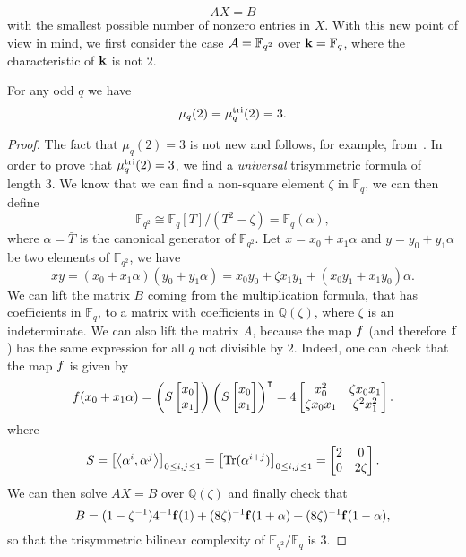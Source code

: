\[
  AX = B
\]
with the smallest possible number of nonzero entries in $X$. With this new point
of view in mind, we first consider the case $\mathcal{A}=\mathbb{F}_{q^2}$ over
$\mathbf{k}=\mathbb{F}_q$, where the characteristic of $\mathbf{k}$ is not $2$.
\begin{prop}
For any odd $q$ we have
\[
  \mu_q(2) = \mu^{\textrm{tri}}_q(2) = 3.
\]
\end{prop}
\begin{proof}
The fact that $\mu_q(2)=3$ is not new and follows, for example, from~\cite[Thm.
2.2]{BCPRRR19}. In order to prove that
$\mu^{\textrm{tri}}_q(2) = 3$, we find a \emph{universal} trisymmetric formula of length
$3$. We know that we can find a non-square element $\zeta$ in $\mathbb{F}_q$, we
can then define
\[
  \mathbb{F}_{q^2}\cong\mathbb{F}_q[T]/(T^2-\zeta)=\mathbb{F}_{q}(\alpha),
\]
where $\alpha=\bar T$ is the canonical generator of $\mathbb{F}_{q^2}$. Let $x =
x_0 + x_1\alpha$ and $y = y_0 + y_1\alpha$ be two elements of
$\mathbb{F}_{q^2}$, we have
\[
  xy = (x_0+x_1\alpha)(y_0+y_1\alpha)=x_0y_0+\zeta x_1y_1
  +(x_0y_1+x_1y_0)\alpha.
\]
We can lift the matrix $B$ coming from
the multiplication formula, that has coefficients in $\mathbb{F}_{q}$, to a
matrix with coefficients in $\mathbb{Q}(\zeta)$, where $\zeta$ is an
indeterminate. We can also lift the matrix $A$, because the map
$f$ (and therefore $\mathbf{f}$) has the same expression for all $q$ not divisible by
$2$.
Indeed, one can check that the map $f$ is given by
\[
  f(x_0+x_1\alpha)=
  \left(S
  \begin{bmatrix}
    x_0 \\
    x_1
  \end{bmatrix}\right)
  \left(S
  \begin{bmatrix}
    x_0 \\
    x_1
  \end{bmatrix}\right)^\intercal
  =
  4\begin{bmatrix}
   x_0^2 & \zeta x_0x_1 \\
   \zeta x_0 x_1 & \zeta^2 x_1^2
  \end{bmatrix}.
\]
where
\[
  S =
  \begin{bmatrix}
    \left\langle\alpha^i,\alpha^j\right\rangle
  \end{bmatrix}_{0\leq i, j\leq 1}
  =
  \begin{bmatrix}
    \operatorname{Tr}(\alpha^{i+j})
  \end{bmatrix}_{0\leq i, j\leq 1}
  =
  \begin{bmatrix}
   2 & 0 \\
   0 & 2\zeta
  \end{bmatrix}.
\]
We can then solve $AX=B$ over
$\mathbb{Q}(\zeta)$ and finally check that
\[
  B = (1-\zeta^{-1})4^{-1}\mathbf{f}(1) +
  (8\zeta)^{-1}\mathbf{f}(1+\alpha)+(8\zeta)^{-1}\mathbf{f}(1-\alpha),
\]
so that the trisymmetric bilinear complexity of
$\mathbb{F}_{q^2}/\mathbb{F}_{q}$ is $3$.
\end{proof}
